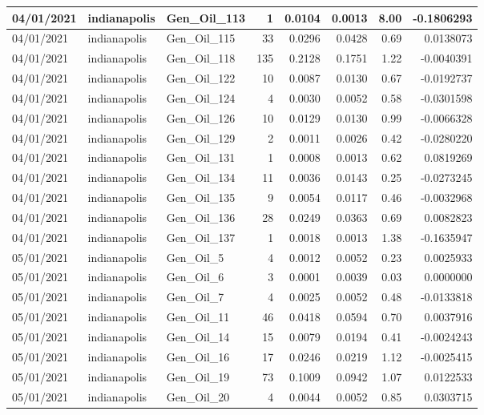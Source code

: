 \documentclass[
  letterpaper,
  DIV=11,
  numbers=noendperiod]{scrartcl}
\begin{document}
\begin{tabular}{l|l|l|r|r|r|r|r}
\hline
04/01/2021 & indianapolis & Gen\_Oil\_113 & 1 & 0.0104 & 0.0013 & 8.00 & -0.1806293\\
\hline
04/01/2021 & indianapolis & Gen\_Oil\_115 & 33 & 0.0296 & 0.0428 & 0.69 & 0.0138073\\
\hline
04/01/2021 & indianapolis & Gen\_Oil\_118 & 135 & 0.2128 & 0.1751 & 1.22 & -0.0040391\\
\hline
04/01/2021 & indianapolis & Gen\_Oil\_122 & 10 & 0.0087 & 0.0130 & 0.67 & -0.0192737\\
\hline
04/01/2021 & indianapolis & Gen\_Oil\_124 & 4 & 0.0030 & 0.0052 & 0.58 & -0.0301598\\
\hline
04/01/2021 & indianapolis & Gen\_Oil\_126 & 10 & 0.0129 & 0.0130 & 0.99 & -0.0066328\\
\hline
04/01/2021 & indianapolis & Gen\_Oil\_129 & 2 & 0.0011 & 0.0026 & 0.42 & -0.0280220\\
\hline
04/01/2021 & indianapolis & Gen\_Oil\_131 & 1 & 0.0008 & 0.0013 & 0.62 & 0.0819269\\
\hline
04/01/2021 & indianapolis & Gen\_Oil\_134 & 11 & 0.0036 & 0.0143 & 0.25 & -0.0273245\\
\hline
04/01/2021 & indianapolis & Gen\_Oil\_135 & 9 & 0.0054 & 0.0117 & 0.46 & -0.0032968\\
\hline
04/01/2021 & indianapolis & Gen\_Oil\_136 & 28 & 0.0249 & 0.0363 & 0.69 & 0.0082823\\
\hline
04/01/2021 & indianapolis & Gen\_Oil\_137 & 1 & 0.0018 & 0.0013 & 1.38 & -0.1635947\\
\hline
05/01/2021 & indianapolis & Gen\_Oil\_5 & 4 & 0.0012 & 0.0052 & 0.23 & 0.0025933\\
\hline
05/01/2021 & indianapolis & Gen\_Oil\_6 & 3 & 0.0001 & 0.0039 & 0.03 & 0.0000000\\
\hline
05/01/2021 & indianapolis & Gen\_Oil\_7 & 4 & 0.0025 & 0.0052 & 0.48 & -0.0133818\\
\hline
05/01/2021 & indianapolis & Gen\_Oil\_11 & 46 & 0.0418 & 0.0594 & 0.70 & 0.0037916\\
\hline
05/01/2021 & indianapolis & Gen\_Oil\_14 & 15 & 0.0079 & 0.0194 & 0.41 & -0.0024243\\
\hline
05/01/2021 & indianapolis & Gen\_Oil\_16 & 17 & 0.0246 & 0.0219 & 1.12 & -0.0025415\\
\hline
05/01/2021 & indianapolis & Gen\_Oil\_19 & 73 & 0.1009 & 0.0942 & 1.07 & 0.0122533\\
\hline
05/01/2021 & indianapolis & Gen\_Oil\_20 & 4 & 0.0044 & 0.0052 & 0.85 & 0.0303715\\

\end{tabular}
\end{document}
